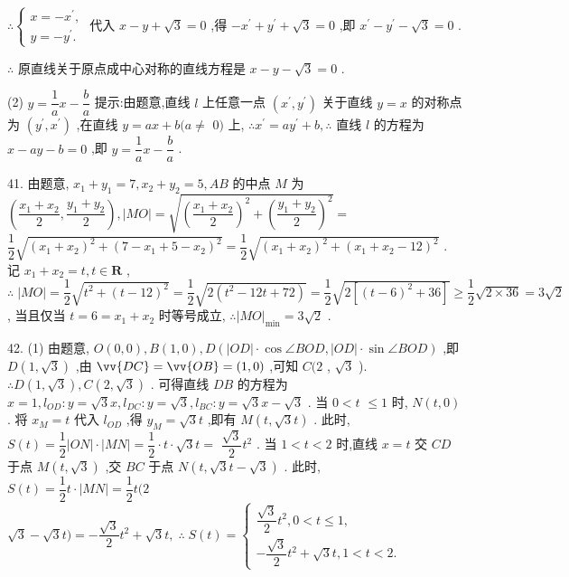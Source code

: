$\therefore \left\{  \begin{array}{l} x =  - {x}^{\prime }, \\  y =  - {y}^{\prime }. \end{array}\right.$ 代入 $x - y + \sqrt{3} = 0$ ,得 $- {x}^{\prime } + {y}^{\prime } + \sqrt{3} = 0$ ,即 ${x}^{\prime } - {y}^{\prime } - \sqrt{3} = 0$ .

$\therefore$ 原直线关于原点成中心对称的直线方程是 $x - y - \sqrt{3} = 0$ .

(2) $y = \dfrac{1}{a}x - \dfrac{b}{a}$ 提示:由题意,直线 $l$ 上任意一点 $\left( {{x}^{\prime },{y}^{\prime }}\right)$ 关于直线 $y = x$ 的对称点为 $\left( {{y}^{\prime },{x}^{\prime }}\right)$ ,在直线 $y = {ax} + b(a \neq$  $0)$ 上, $\therefore {x}^{\prime } = a{y}^{\prime } + b,\therefore$ 直线 $l$ 的方程为 $x - {ay} - b = 0$ ,即 $y = \dfrac{1}{a}x - \dfrac{b}{a}$ .

41. 由题意, ${x}_{1} + {y}_{1} = 7,{x}_{2} + {y}_{2} = 5,{AB}$ 的中点 $M$ 为 $\left( {\dfrac{{x}_{1} + {x}_{2}}{2},\dfrac{{y}_{1} + {y}_{2}}{2}}\right) ,\left| {MO}\right|  = \sqrt{{\left( \dfrac{{x}_{1} + {x}_{2}}{2}\right) }^{2} + {\left( \dfrac{{y}_{1} + {y}_{2}}{2}\right) }^{2}} =$  $\dfrac{1}{2}\sqrt{{\left( {x}_{1} + {x}_{2}\right) }^{2} + {\left( 7 - {x}_{1} + 5 - {x}_{2}\right) }^{2}} = \dfrac{1}{2}\sqrt{{\left( {x}_{1} + {x}_{2}\right) }^{2} + {\left( {x}_{1} + {x}_{2} - {12}\right) }^{2}}$ . 记 ${x}_{1} + {x}_{2} = t,t \in  \mathbf{R}$ , $\therefore \;\left| {MO}\right|  = \dfrac{1}{2}\sqrt{{t}^{2} + {\left( t - {12}\right) }^{2}} = \dfrac{1}{2}\sqrt{2\left( {{t}^{2} - {12t} + {72}}\right) } = \dfrac{1}{2}\sqrt{2\left\lbrack  {{\left( t - 6\right) }^{2} + {36}}\right\rbrack  } \geq  \dfrac{1}{2}\sqrt{2 \times  {36}} = 3\sqrt{2}$ , 当且仅当 $t = 6 = {x}_{1} + {x}_{2}$ 时等号成立, $\therefore {\left| MO\right| }_{\min } = 3\sqrt{2}$ .

42. (1) 由题意, $O\left( {0,0}\right) ,B\left( {1,0}\right) ,D\left( {\left| {OD}\right|  \cdot  \cos \angle {BOD},\left| {OD}\right|  \cdot  \sin \angle {BOD}}\right)$ ,即 $D\left( {1,\sqrt{3}}\right)$ ,由 $\vv{DC} = \vv{OB} = \left( {1,0}\right)$ ,可知 $C(2$ , $\sqrt{3}$ ). $\therefore D\left( {1,\sqrt{3}}\right) ,C\left( {2,\sqrt{3}}\right)$ . 可得直线 ${DB}$ 的方程为 $x = 1,{l}_{OD} : y = \sqrt{3}x,{l}_{DC} : y = \sqrt{3},{l}_{BC} : y = \sqrt{3}x - \sqrt{3}$ . 当 $0 < t$  $\leq  1$ 时, $N\left( {t,0}\right)$ . 将 ${x}_{M} = t$ 代入 ${l}_{OD}$ ,得 ${y}_{M} = \sqrt{3}t$ ,即有 $M\left( {t,\sqrt{3}t}\right)$ . 此时, $S\left( t\right)  = \dfrac{1}{2}\left| {ON}\right|  \cdot  \left| {MN}\right|  = \dfrac{1}{2} \cdot  t \cdot  \sqrt{3}t =$  $\dfrac{\sqrt{3}}{2}{t}^{2}$ . 当 $1 < t < 2$ 时,直线 $x = t$ 交 ${CD}$ 于点 $M\left( {t,\sqrt{3}}\right)$ ,交 ${BC}$ 于点 $N\left( {t,\sqrt{3}t - \sqrt{3}}\right)$ . 此时, $S\left( t\right)  = \dfrac{1}{2}t \cdot  \left| {MN}\right|  = \dfrac{1}{2}t(2$  $\sqrt{3} - \sqrt{3}t) =  - \dfrac{\sqrt{3}}{2}{t}^{2} + \sqrt{3}t,\;\therefore \;S\left( t\right)  = \left\{  \begin{array}{l} \dfrac{\sqrt{3}}{2}{t}^{2},0 < t \leq  1, \\   - \dfrac{\sqrt{3}}{2}{t}^{2} + \sqrt{3}t,1 < t < 2. \end{array}\right.$

